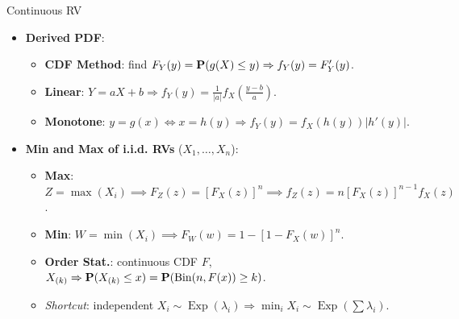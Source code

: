 \documentclass[landscape,a4paper]{article}
\begin{document}
\begin{cheatsheetcolumns}
\begin{card}{Continuous RV}
\begin{itemize}
				\item \textbf{Derived PDF}:
				\begin{itemize}
					\item \textbf{CDF Method}: find $F_Y(y)=\mathbf{P}(g(X)\le y)\Rightarrow f_Y(y)=F_Y'(y)$.
					\item \textbf{Linear}: $Y=aX+b\Rightarrow f_Y(y)=\frac{1}{|a|}f_X\left(\frac{y-b}{a}\right)$.
					\item \textbf{Monotone}: $y=g(x)\Leftrightarrow x=h(y)\Rightarrow f_Y(y)=f_X(h(y))|h'(y)|$.
				\end{itemize}
				
				\item \textbf{Min and Max of i.i.d. RVs} ($X_1, \dots, X_n$):
				\begin{itemize}
					\item \textbf{Max}: $Z = \max(X_i) \implies F_Z(z) = [F_X(z)]^n \implies f_Z(z) = n[F_X(z)]^{n-1} f_X(z)$.
					\item \textbf{Min}: $W = \min(X_i) \implies F_W(w) = 1 - [1 - F_X(w)]^n$.
					\item \textbf{Order Stat.}: continuous CDF $F$, $X_{(k)}\Rightarrow \mathbf{P}(X_{(k)}\le x)=\mathbf{P}(\operatorname{Bin}(n,F(x))\ge k)$.
					\item \textit{Shortcut}: independent $X_i \sim \operatorname{Exp}(\lambda_i)\Rightarrow \min_iX_i \sim \operatorname{Exp}(\sum \lambda_i)$.
				\end{itemize}
				

\end{itemize}
\end{card}
\end{cheatsheetcolumns}
\end{document}
